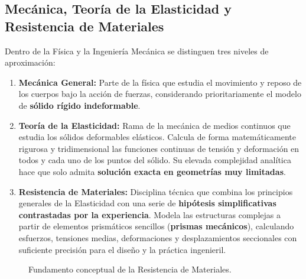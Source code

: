\subsection{Mecánica, Teoría de la Elasticidad y Resistencia de Materiales}
Dentro de la Física y la Ingeniería Mecánica se distinguen tres niveles de aproximación:
\begin{enumerate}
    \item \textbf{Mecánica General:} Parte de la física que estudia el movimiento y reposo de los cuerpos bajo la acción de fuerzas, considerando prioritariamente el modelo de \textbf{sólido rígido indeformable}.
    \item \textbf{Teoría de la Elasticidad:} Rama de la mecánica de medios continuos que estudia los sólidos deformables elásticos. Calcula de forma matemáticamente rigurosa y tridimensional las funciones continuas de tensión y deformación en todos y cada uno de los puntos del sólido. Su elevada complejidad analítica hace que solo admita \textbf{solución exacta en geometrías muy limitadas}.
    \item \textbf{Resistencia de Materiales:} Disciplina técnica que combina los principios generales de la Elasticidad con una serie de \textbf{hipótesis simplificativas contrastadas por la experiencia}. Modela las estructuras complejas a partir de elementos prismáticos sencillos (\textbf{prismas mecánicos}), calculando esfuerzos, tensiones medias, deformaciones y desplazamientos seccionales con suficiente precisión para el diseño y la práctica ingenieril.
\end{enumerate}

\begin{figure}[H]
    \centering
    \caption{Fundamento conceptual de la Resistencia de Materiales.}
    \label{fig:fundamento_rm}
\end{figure}


